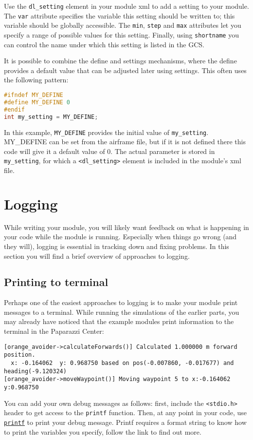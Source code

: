 \documentclass{article}
\begin{document}
Use the \texttt{dl\_setting} element in your module xml to add a setting to your module. The \texttt{var} attribute specifies the variable this setting should be written to; this variable should be globally accessible. The \texttt{min}, \texttt{step} and \texttt{max} attributes let you specify a range of possible values for this setting. Finally, using \texttt{shortname} you can control the name under which this setting is listed in the GCS.

It is possible to combine the define and settings mechanisms, where the define provides a default value that can be adjusted later using settings. This often uses the following pattern:
\begin{lstlisting}[language=c]
#ifndef MY_DEFINE
#define MY_DEFINE 0
#endif
int my_setting = MY_DEFINE;
\end{lstlisting}
In this example, \texttt{MY\_DEFINE} provides the initial value of \texttt{my\_setting}. MY\_DEFINE can be set from the airframe file, but if it is not defined there this code will give it a default value of 0. The actual parameter is stored in \texttt{my\_setting}, for which a \texttt{<dl\_setting>} element is included in the module's xml file.





\section{Logging}\label{sec:logging}
While writing your module, you will likely want feedback on what is happening in your code while the module is running. Especially when things go wrong (and they will), logging is essential in tracking down and fixing problems. In this section you will find a brief overview of approaches to logging.

\subsection{Printing to terminal}
Perhaps one of the easiest approaches to logging is to make your module print messages to a terminal. While running the simulations of the earlier parts, you may already have noticed that the example modules print information to the terminal in the Paparazzi Center:
\begin{lstlisting}
[orange_avoider->calculateForwards()] Calculated 1.000000 m forward position.
  x: -0.164062  y: 0.968750 based on pos(-0.007860, -0.017677) and heading(-9.120324)
[orange_avoider->moveWaypoint()] Moving waypoint 5 to x:-0.164062 y:0.968750
\end{lstlisting}
You can add your own debug messages as follows: first, include the \texttt{<stdio.h>} header to get access to the \texttt{printf} function. Then, at any point in your code, use \href{http://www.cplusplus.com/reference/cstdio/printf/}{\texttt{printf}} to print your debug message. Printf requires a format string to know how to print the variables you specify, follow the link to find out more.
\end{document}
